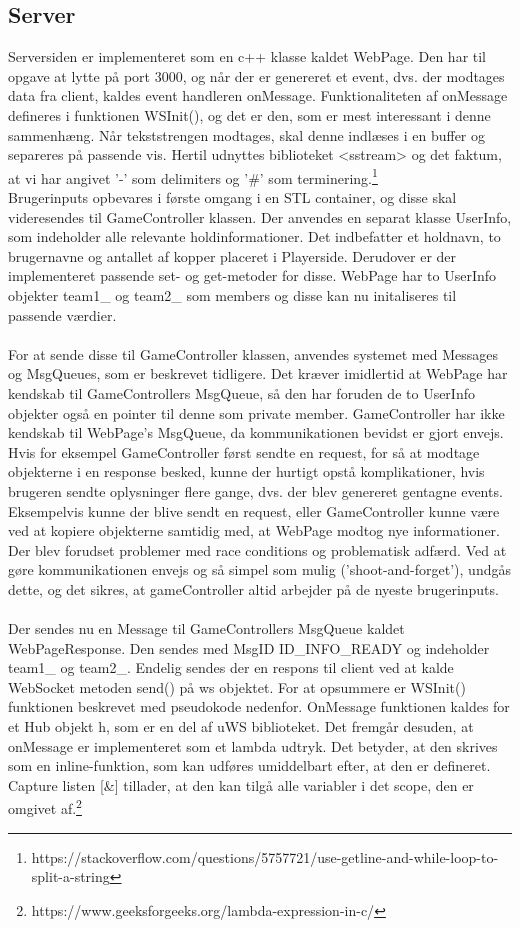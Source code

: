 \documentclass[Softwaredesign/Softwaredesign_main.tex]{subfiles}
\begin{document}
\subsection{Server}
Serversiden er implementeret som en c++ klasse kaldet WebPage. Den har til opgave at lytte på port 3000, og når der er genereret et event, dvs. der modtages data fra client, kaldes event handleren onMessage. Funktionaliteten af onMessage defineres i funktionen WSInit(), og det er den, som er mest interessant i denne sammenhæng. Når tekststrengen modtages, skal denne indlæses i en buffer og separeres på passende vis. Hertil udnyttes biblioteket <sstream> og det faktum, at vi har angivet '-' som delimiters og '\#' som terminering.\footnote{https://stackoverflow.com/questions/5757721/use-getline-and-while-loop-to-split-a-string} \\Brugerinputs opbevares i første omgang i en STL container, og disse skal videresendes til GameController klassen. Der anvendes en separat klasse UserInfo, som indeholder alle relevante holdinformationer. Det indbefatter et holdnavn, to brugernavne og antallet af kopper placeret i Playerside. Derudover er der implementeret passende set- og get-metoder for disse. WebPage har to UserInfo objekter team1\_ og team2\_ som members og disse kan nu initaliseres til passende værdier. \\\\For at sende disse til GameController klassen, anvendes systemet med Messages og MsgQueues, som er beskrevet tidligere. Det kræver imidlertid at WebPage har kendskab til GameControllers MsgQueue, så den har foruden de to UserInfo objekter også en pointer til denne som private member. GameController har ikke kendskab til WebPage's MsgQueue, da kommunikationen bevidst er gjort envejs. Hvis for eksempel GameController først sendte en request, for så at modtage objekterne i en response besked, kunne der hurtigt opstå komplikationer, hvis brugeren sendte oplysninger flere gange, dvs. der blev genereret gentagne events. Eksempelvis kunne der blive sendt en request, eller GameController kunne være ved at kopiere objekterne samtidig med, at WebPage modtog nye informationer. Der blev forudset problemer med race conditions og problematisk adfærd. Ved at gøre kommunikationen envejs og så simpel som mulig ('shoot-and-forget'), undgås dette, og det sikres, at gameController altid arbejder på de nyeste brugerinputs.
\\\\Der sendes nu en Message til GameControllers MsgQueue kaldet WebPageResponse. Den sendes med MsgID ID\_INFO\_READY og indeholder team1\_ og team2\_. Endelig sendes der en respons til client ved at kalde WebSocket metoden send() på ws objektet. For at opsummere er WSInit() funktionen beskrevet med pseudokode nedenfor. OnMessage funktionen kaldes for et Hub objekt h, som er en del af uWS biblioteket. Det fremgår desuden, at onMessage er implementeret som et lambda udtryk. Det betyder, at den skrives som en inline-funktion, som kan udføres umiddelbart efter, at den er defineret. Capture listen [\&] tillader, at den kan tilgå alle variabler i det scope, den er omgivet af.\footnote{https://www.geeksforgeeks.org/lambda-expression-in-c/}
\end{document}

